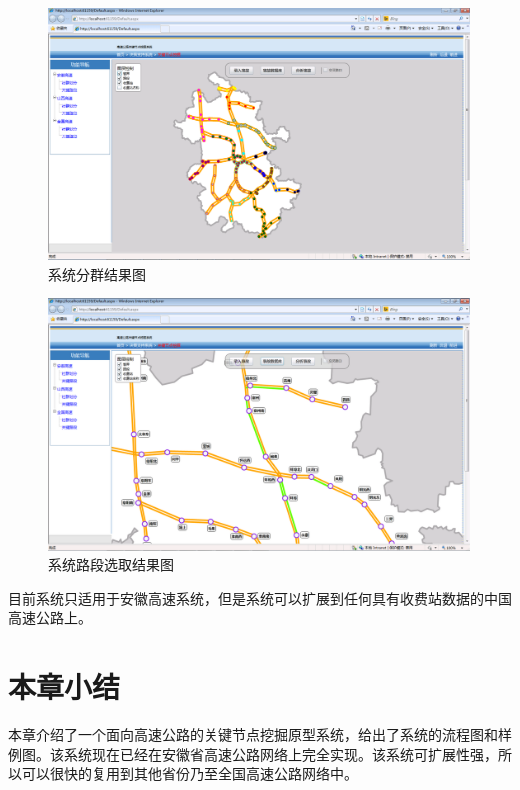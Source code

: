 		\begin{figure}[h]
		\centering
				\begin{minipage}{0.8\linewidth}
					\centering
					\includegraphics[width=4.4in]{picture/yuanxing1}
					\caption{系统分群结果图}
					\label{fig21}
				\end{minipage}%
		\end{figure}


		\begin{figure}[h]
		\centering
				\begin{minipage}{0.8\linewidth}
					\centering
					\includegraphics[width=4.4in]{picture/yuanxing2}
					\caption{系统路段选取结果图}
					\label{fig21}
				\end{minipage}%
		\end{figure}

		目前系统只适用于安徽高速系统，但是系统可以扩展到任何具有收费站数据的中国高速公路上。

	\section{本章小结}
		本章介绍了一个面向高速公路的关键节点挖掘原型系统，给出了系统的流程图和样例图。该系统现在已经在安徽省高速公路网络上完全实现。该系统可扩展性强，所以可以很快的复用到其他省份乃至全国高速公路网络中。

	